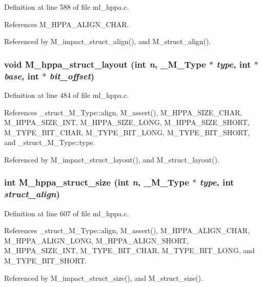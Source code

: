 Definition at line 588 of file ml\_\-hppa.c.

References M\_\-HPPA\_\-ALIGN\_\-CHAR.

Referenced by M\_\-impact\_\-struct\_\-align(), and M\_\-struct\_\-align().
\subsubsection{\setlength{\rightskip}{0pt plus 5cm}void M\_\-hppa\_\-struct\_\-layout (int {\em n}, \bf{\_\-M\_\-Type} $\ast$ {\em type}, int $\ast$ {\em base}, int $\ast$ {\em bit\_\-offset})}\label{m__hppa_8h_7dd9ed529e079966472897bc4afa1f76}




Definition at line 484 of file ml\_\-hppa.c.

References \_\-struct\_\-M\_\-Type::align, M\_\-assert(), M\_\-HPPA\_\-SIZE\_\-CHAR, M\_\-HPPA\_\-SIZE\_\-INT, M\_\-HPPA\_\-SIZE\_\-LONG, M\_\-HPPA\_\-SIZE\_\-SHORT, M\_\-TYPE\_\-BIT\_\-CHAR, M\_\-TYPE\_\-BIT\_\-LONG, M\_\-TYPE\_\-BIT\_\-SHORT, and \_\-struct\_\-M\_\-Type::type.

Referenced by M\_\-impact\_\-struct\_\-layout(), and M\_\-struct\_\-layout().
\subsubsection{\setlength{\rightskip}{0pt plus 5cm}int M\_\-hppa\_\-struct\_\-size (int {\em n}, \bf{\_\-M\_\-Type} $\ast$ {\em type}, int {\em struct\_\-align})}\label{m__hppa_8h_4ea35ed533f5fb0b57fe7591146ccb7f}




Definition at line 607 of file ml\_\-hppa.c.

References \_\-struct\_\-M\_\-Type::align, M\_\-assert(), M\_\-HPPA\_\-ALIGN\_\-CHAR, M\_\-HPPA\_\-ALIGN\_\-LONG, M\_\-HPPA\_\-ALIGN\_\-SHORT, M\_\-HPPA\_\-SIZE\_\-INT, M\_\-TYPE\_\-BIT\_\-CHAR, M\_\-TYPE\_\-BIT\_\-LONG, and M\_\-TYPE\_\-BIT\_\-SHORT.

Referenced by M\_\-impact\_\-struct\_\-size(), and M\_\-struct\_\-size().
